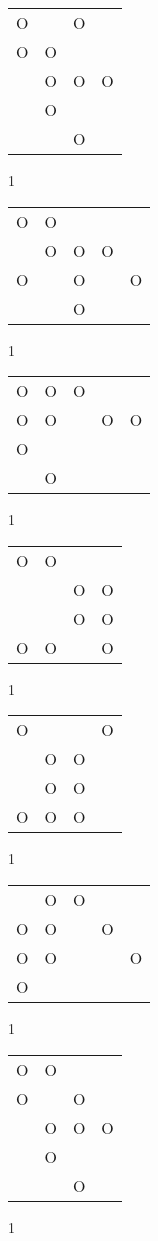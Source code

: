 \begin{tabular}{|m{0.2cm}m{0.2cm}m{0.2cm}m{0.2cm}|}\hline
O& &O& \\
O&O& & \\
 &O&O&O\\
 &O& & \\
 & &O& \\
\hline\end{tabular}1
\begin{tabular}{|m{0.2cm}m{0.2cm}m{0.2cm}m{0.2cm}m{0.2cm}|}\hline
O&O& & & \\
 &O&O&O& \\
O& &O& &O\\
 & &O& & \\
\hline\end{tabular}1
\begin{tabular}{|m{0.2cm}m{0.2cm}m{0.2cm}m{0.2cm}m{0.2cm}|}\hline
O&O&O& & \\
O&O& &O&O\\
O& & & & \\
 &O& & & \\
\hline\end{tabular}1
\begin{tabular}{|m{0.2cm}m{0.2cm}m{0.2cm}m{0.2cm}|}\hline
O&O& & \\
 & &O&O\\
 & &O&O\\
O&O& &O\\
\hline\end{tabular}1
\begin{tabular}{|m{0.2cm}m{0.2cm}m{0.2cm}m{0.2cm}|}\hline
O& & &O\\
 &O&O& \\
 &O&O& \\
O&O&O& \\
\hline\end{tabular}1
\begin{tabular}{|m{0.2cm}m{0.2cm}m{0.2cm}m{0.2cm}m{0.2cm}|}\hline
 &O&O& & \\
O&O& &O& \\
O&O& & &O\\
O& & & & \\
\hline\end{tabular}1
\begin{tabular}{|m{0.2cm}m{0.2cm}m{0.2cm}m{0.2cm}|}\hline
O&O& & \\
O& &O& \\
 &O&O&O\\
 &O& & \\
 & &O& \\
\hline\end{tabular}1

